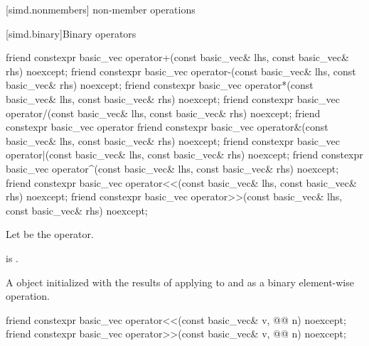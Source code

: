 [simd.nonmembers]{ non-member operations}

[simd.binary]{Binary operators}

\begin{itemdecl}
friend constexpr basic_vec operator+(const basic_vec& lhs, const basic_vec& rhs) noexcept;
friend constexpr basic_vec operator-(const basic_vec& lhs, const basic_vec& rhs) noexcept;
friend constexpr basic_vec operator*(const basic_vec& lhs, const basic_vec& rhs) noexcept;
friend constexpr basic_vec operator/(const basic_vec& lhs, const basic_vec& rhs) noexcept;
friend constexpr basic_vec operator%
friend constexpr basic_vec operator&(const basic_vec& lhs, const basic_vec& rhs) noexcept;
friend constexpr basic_vec operator|(const basic_vec& lhs, const basic_vec& rhs) noexcept;
friend constexpr basic_vec operator^(const basic_vec& lhs, const basic_vec& rhs) noexcept;
friend constexpr basic_vec operator<<(const basic_vec& lhs, const basic_vec& rhs) noexcept;
friend constexpr basic_vec operator>>(const basic_vec& lhs, const basic_vec& rhs) noexcept;
\end{itemdecl}

\begin{itemdescr}
\pnum
Let  be the operator.

\pnum
\constraints
{} is
.

\pnum
\returns
A  object initialized with the results of applying
 to  and  as a binary element-wise
operation.
\end{itemdescr}

\begin{itemdecl}
friend constexpr basic_vec operator<<(const basic_vec& v, @@ n) noexcept;
friend constexpr basic_vec operator>>(const basic_vec& v, @@ n) noexcept;
\end{itemdecl}

